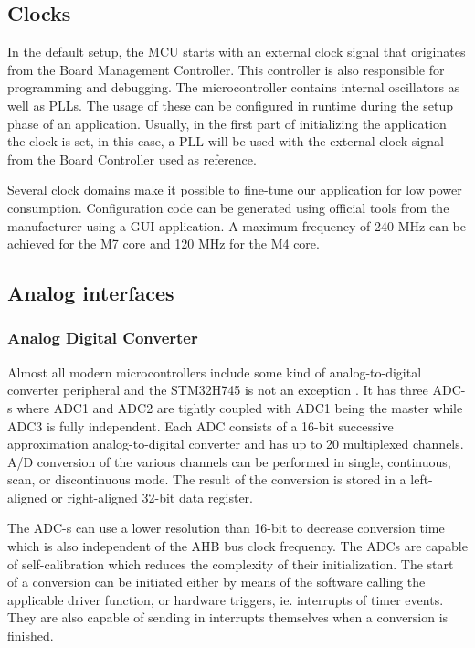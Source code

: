\subsection{Clocks}

In the default setup, the MCU starts with an external clock signal that originates from the Board Management Controller. This controller is also responsible for programming and debugging. The microcontroller contains internal oscillators as well as PLLs. The usage of these can be configured in runtime during the setup phase of an application. Usually, in the first part of initializing the application the clock is set, in this case, a PLL will be used with the external clock signal from the Board Controller used as reference.

Several clock domains make it possible to fine-tune our application for low power consumption. Configuration code can be generated using official tools from the manufacturer using a GUI application. A maximum frequency of 240 MHz can be achieved for the M7 core and 120 MHz for the M4 core.

\subsection{Analog interfaces}

\subsubsection{Analog Digital Converter}

Almost all modern microcontrollers include some kind of analog-to-digital converter peripheral and the STM32H745 is not an exception \cite{ADCDescription}. It has three ADC-s where ADC1 and ADC2 are tightly coupled with ADC1 being the master while ADC3 is fully independent. Each ADC consists of a 16-bit successive approximation analog-to-digital converter and has up to 20 multiplexed channels. A/D conversion of the various channels can be performed in single, continuous, scan, or discontinuous mode. The result of the conversion is stored in a left-aligned or right-aligned 32-bit data register.

The ADC-s can use a lower resolution than 16-bit to decrease conversion time which is also independent of the AHB bus clock frequency. The ADCs are capable of self-calibration which reduces the complexity of their initialization. The start of a conversion can be initiated either by means of the software calling the applicable driver function, or hardware triggers, ie. interrupts of timer events. They are also capable of sending in interrupts themselves when a conversion is finished.


